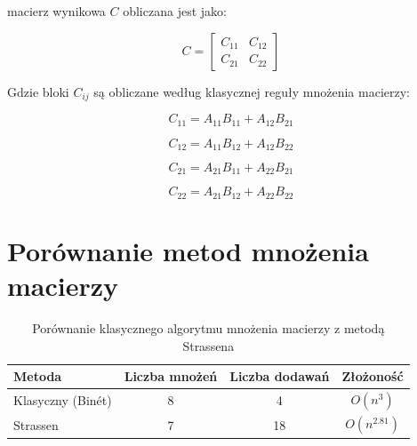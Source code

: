\documentclass{article}
\begin{document}
macierz wynikowa \( C \) obliczana jest jako:

\[
C =
\begin{bmatrix}
C_{11} & C_{12} \\
C_{21} & C_{22}
\end{bmatrix}
\]

Gdzie bloki \( C_{ij} \) są obliczane według klasycznej reguły mnożenia macierzy:

\[
C_{11} = A_{11} B_{11} + A_{12} B_{21}
\]

\[
C_{12} = A_{11} B_{12} + A_{12} B_{22}
\]

\[
C_{21} = A_{21} B_{11} + A_{22} B_{21}
\]

\[
C_{22} = A_{21} B_{12} + A_{22} B_{22}
\]

\section{Porównanie metod mnożenia macierzy}

\begin{table}[h]
    \centering
    \renewcommand{\arraystretch}{1.5} %
    \begin{tabular}{|l|c|c|c|}
        \hline
        \textbf{Metoda} & \textbf{Liczba mnożeń} & \textbf{Liczba dodawań} & \textbf{Złożoność} \\
        \hline
        Klasyczny (Binét) & 8 & 4 & \( O(n^3) \) \\
        \hline
        Strassen & 7 & 18 & \( O(n^{2.81}) \) \\
        \hline
    \end{tabular}
    \caption{Porównanie klasycznego algorytmu mnożenia macierzy z metodą Strassena}
    \label{tab:porownanie}
\end{table}
\end{document}

